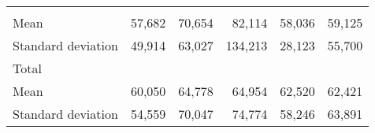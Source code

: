 \begin{tabular}{llllll}
  \multicolumn{1}{|r}{} &
  \multicolumn{1}{r}{} &
  \multicolumn{1}{r}{} &
  \multicolumn{1}{r}{} &
  \multicolumn{1}{r}{} \\
\multicolumn{1}{l}{\hspace{4em}Mean} &
  \multicolumn{1}{|r}{57,682} &
  \multicolumn{1}{r}{70,654} &
  \multicolumn{1}{r}{82,114} &
  \multicolumn{1}{r}{58,036} &
  \multicolumn{1}{r}{59,125} \\
\multicolumn{1}{l}{\hspace{4em}Standard deviation} &
  \multicolumn{1}{|r}{49,914} &
  \multicolumn{1}{r}{63,027} &
  \multicolumn{1}{r}{134,213} &
  \multicolumn{1}{r}{28,123} &
  \multicolumn{1}{r}{55,700} \\
\multicolumn{1}{l}{\hspace{3em}Total} &
  \multicolumn{1}{|r}{} &
  \multicolumn{1}{r}{} &
  \multicolumn{1}{r}{} &
  \multicolumn{1}{r}{} &
  \multicolumn{1}{r}{} \\
\multicolumn{1}{l}{\hspace{4em}Mean} &
  \multicolumn{1}{|r}{60,050} &
  \multicolumn{1}{r}{64,778} &
  \multicolumn{1}{r}{64,954} &
  \multicolumn{1}{r}{62,520} &
  \multicolumn{1}{r}{62,421} \\
\multicolumn{1}{l}{\hspace{4em}Standard deviation} &
  \multicolumn{1}{|r}{54,559} &
  \multicolumn{1}{r}{70,047} &
  \multicolumn{1}{r}{74,774} &
  \multicolumn{1}{r}{58,246} &
  \multicolumn{1}{r}{63,891} \\
\cline{1-6}
\end{tabular}

